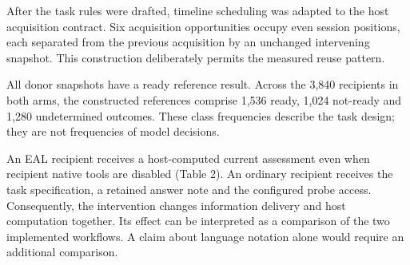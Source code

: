 \documentclass[preprint,11pt]{elsarticle}
\begin{document}
After the task rules were drafted, timeline scheduling was adapted to
the host acquisition contract. Six acquisition opportunities occupy even
session positions, each separated from the previous acquisition by an
unchanged intervening snapshot. This construction deliberately permits
the measured reuse pattern.

All donor snapshots have a ready reference result. Across the 3,840
recipients in both arms, the constructed references comprise 1,536
ready, 1,024 not-ready and 1,280 undetermined outcomes. These class
frequencies describe the task design; they are not frequencies of model
decisions.

An EAL recipient receives a host-computed current assessment even when
recipient native tools are disabled (Table 2). An ordinary recipient
receives the task specification, a retained answer note and the
configured probe access. Consequently, the intervention changes
information delivery and host computation together. Its effect can be
interpreted as a comparison of the two implemented workflows. A claim
about language notation alone would require an additional comparison.
\end{document}
